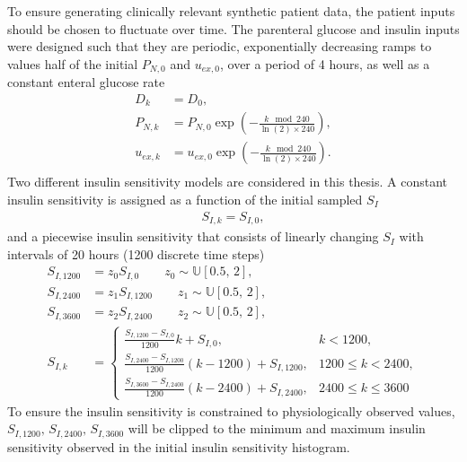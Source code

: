 \documentclass[nomenclature, english, bibtex]{kththesis}
\begin{document}
To ensure generating clinically relevant synthetic patient data, the patient inputs should be chosen to fluctuate over time. The parenteral glucose and insulin inputs were designed such that they are periodic, exponentially decreasing ramps to values half of the initial $P_{N,0}$ and $u_{ex,0}$, over a period of 4 hours, as well as a constant enteral glucose rate
\begin{equation}
\begin{aligned}
D_k &= D_0, \\
P_{N,k} &= P_{N,0}\exp\left(-\frac{k \mod 240}{\ln(2) \times 240}\right), \\
u_{ex, k} &= u_{ex, 0}\exp\left(-\frac{k \mod 240}{\ln(2) \times 240}\right). \\
\end{aligned}
\end{equation}
Two different insulin sensitivity models are considered in this thesis. A constant insulin sensitivity is assigned as a function of the initial sampled $S_I$
\begin{align}
S_{I,k} = S_{I,0},
\end{align}
and a piecewise insulin sensitivity that consists of linearly changing $S_I$ with intervals of 20 hours (1200 discrete time steps)
\begin{equation}\label{eq:piecewise}
\begin{aligned}
S_{I,1200} &= z_0S_{I,0} \qquad z_0 \sim \mathbb{U}[0.5, \,2], \\
S_{I,2400} &= z_1S_{I,1200} \qquad z_1 \sim \mathbb{U}[0.5, \,2], \\
S_{I,3600} &= z_2S_{I,2400} \qquad z_2 \sim \mathbb{U}[0.5, \,2], \\
S_{I,k} &=
\begin{cases}
\frac{S_{I, 1200} - S_{I, 0}}{1200}k + S_{I,0}, \qquad & k < 1200, \\[1ex]
\frac{S_{I, 2400} - S_{I, 1200}}{1200}(k-1200) + S_{I,1200}, & 1200 \leq k < 2400, \\[1ex]
\frac{S_{I, 3600} - S_{I, 2400}}{1200}(k-2400) + S_{I,2400}, & 2400 \leq k \leq 3600
\end{cases}
\end{aligned}
\end{equation}
To ensure the insulin sensitivity is constrained to physiologically observed values, $S_{I,1200}, \,S_{I,2400}, \,S_{I,3600}$ will be clipped to the minimum and maximum insulin sensitivity observed in the initial insulin sensitivity histogram.
\end{document}
